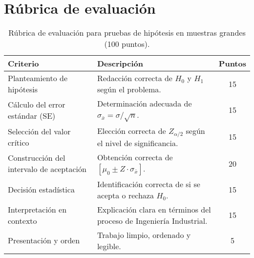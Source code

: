 
\section{Rúbrica de evaluación}

\begin{table}[H]
\centering
\begin{tabular}{p{} p{} c}
\toprule
\textbf{Criterio} & \textbf{Descripción} & \textbf{Puntos}\\
\midrule
Planteamiento de hipótesis & Redacción correcta de $H_0$ y $H_1$ según el problema. & 15\\
Cálculo del error estándar (SE) & Determinación adecuada de $\sigma_{\bar{x}} = \sigma/\sqrt{n}$. & 15\\
Selección del valor crítico & Elección correcta de $Z_{\alpha/2}$ según el nivel de significancia. & 15\\
Construcción del intervalo de aceptación & Obtención correcta de $[\mu_0 \pm Z\cdot\sigma_{\bar{x}}]$. & 20\\
Decisión estadística & Identificación correcta de si se acepta o rechaza $H_0$. & 15\\
Interpretación en contexto & Explicación clara en términos del proceso de Ingeniería Industrial. & 15\\
Presentación y orden & Trabajo limpio, ordenado y legible. & 5\\
\bottomrule
\end{tabular}
\caption{Rúbrica de evaluación para pruebas de hipótesis en muestras grandes (100 puntos).}
\end{table}